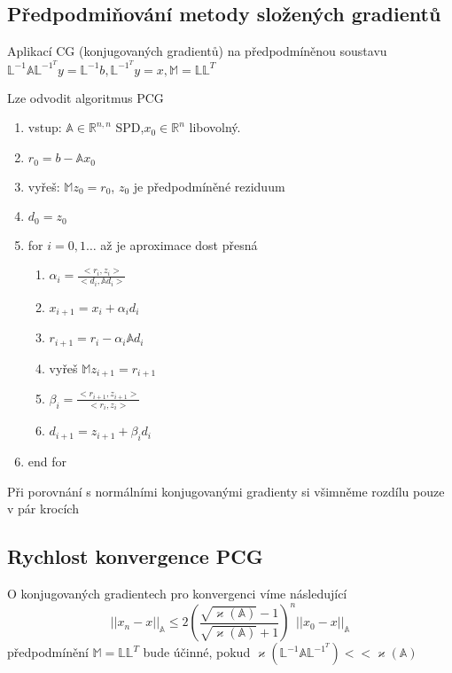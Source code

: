 \documentclass[../main.tex]{subfiles}
\begin{document}
\subsection{Předpodmiňování metody složených gradientů}
Aplikací CG (konjugovaných gradientů) na předpodmíněnou soustavu 
$\mathbb{L}^{-1}\mathbb{A}\mathbb{L}^{-1^T} y = \mathbb{L}^{-1}b, \mathbb{L}^{-1^T}y = x, \mathbb{M} = \mathbb{L}\mathbb{L}^T$

Lze odvodit algoritmus PCG 
\begin{enumerate}
    \item vstup: $\mathbb{A}\in\mathbb{R}^{n,n}$ SPD,$x_0\in\mathbb{R}^n$ libovolný.
    \item $r_0 = b - \mathbb{A}x_0$
    \item vyřeš: $\mathbb{M}z_0 = r_0$, $z_0$ je předpodmíněné reziduum
    \item $d_0 = z_0$
    \item for $i=0,1\dots$ až je aproximace dost přesná \begin{enumerate}
        \item $\alpha_i = \frac{<r_i, z_i>}{<d_i, \mathbb{A}d_i>}$
        \item $x_{i+1} = x_i + \alpha_i d_i$
        \item $r_{i+1} = r_i - \alpha_i \mathbb{A} d_i$
        \item vyřeš $\mathbb{M}z_{i+1} = r_{i+1}$
        \item $\beta_i = \frac{<r_{i+1}, z_{i+1}>}{<r_i, z_i>}$
        \item $d_{i+1} = z_{i+1} + \beta_i d_i$
    \end{enumerate}
    \item end for 
\end{enumerate}

\begin{remark}
    Při porovnání s normálními konjugovanými gradienty si všimněme rozdílu pouze v pár krocích
\end{remark}

\subsection{Rychlost konvergence PCG}

O konjugovaných gradientech pro konvergenci víme následující \begin{equation*}
    ||x_n -x ||_\mathbb{A} \leq 2 \left( \frac{\sqrt{\varkappa(\mathbb{A})}-1}{\sqrt{\varkappa(\mathbb{A})}+1} \right)^n ||x_0 -x||_\mathbb{A}
\end{equation*}
předpodmínění $\mathbb{M} = \mathbb{L} \mathbb{L}^T$ bude účinné, pokud $\varkappa(\mathbb{L}^{-1}\mathbb{A}\mathbb{L}^{-1^T}) << \varkappa(\mathbb{A})$
\end{document}
